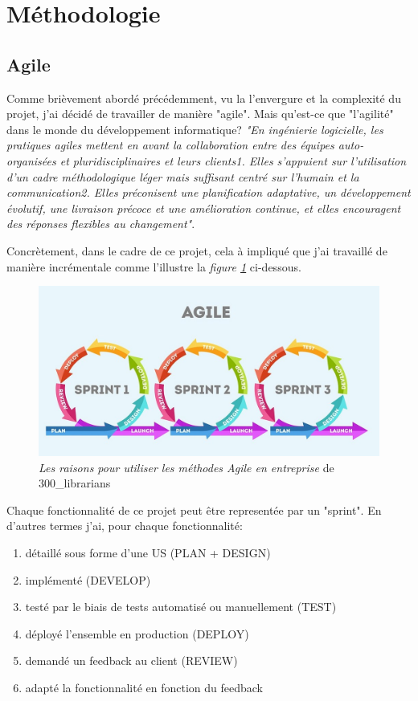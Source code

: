 \section{Méthodologie}
\subsection{Agile}

Comme brièvement abordé précédemment, vu la l'envergure et la complexité du projet, j'ai décidé de travailler de manière "agile". Mais qu'est-ce que "l'agilité" dans le monde du développement informatique? \textit{"En ingénierie logicielle, les pratiques agiles mettent en avant la collaboration entre des équipes auto-organisées et pluridisciplinaires et leurs clients1. Elles s'appuient sur l'utilisation d'un cadre méthodologique léger mais suffisant centré sur l'humain et la communication2. Elles préconisent une planification adaptative, un développement évolutif, une livraison précoce et une amélioration continue, et elles encouragent des réponses flexibles au changement"\cite{Agile}}.

\newpara

Concrètement, dans le cadre de ce projet, cela à impliqué que j'ai travaillé de manière incrémentale comme l'illustre la \textit{figure \ref{agile}} ci-dessous. 
\begin{figure}[H]
  \centering
  \includegraphics[width=0.75\linewidth]{img/agile.jpeg}
  \caption{ \textit{Les raisons pour utiliser les méthodes Agile en entreprise} de 300\_librarians}
  \label{agile}
\end{figure}
Chaque fonctionnalité de ce projet peut être representée par un "sprint". En d'autres termes j'ai, pour chaque fonctionnalité: 
\begin{enumerate}
  \item détaillé sous forme d'une US (PLAN + DESIGN) 
  \item implémenté (DEVELOP)
  \item testé par le biais de tests automatisé ou manuellement (TEST)
  \item déployé l'ensemble en production (DEPLOY)
  \item demandé un feedback au client (REVIEW)
  \item adapté la fonctionnalité en fonction du feedback 
\end{enumerate} 


